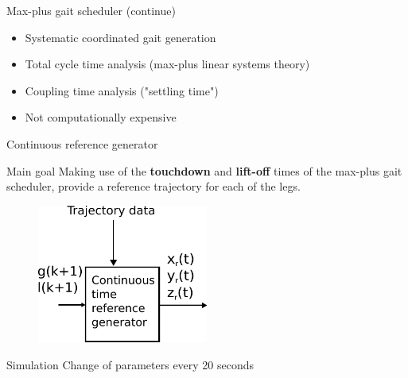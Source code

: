 \documentclass[10pt]{beamer}
\begin{document}
\begin{frame}{Max-plus gait scheduler (continue)}
\begin{itemize}
	\setlength\itemsep{2em}
	\item Systematic coordinated gait generation 
	\item Total cycle time analysis (max-plus linear systems theory)
	\item Coupling time analysis ("settling time")
	\item Not computationally expensive
\end{itemize}	
\end{frame}

\begin{frame}{Continuous reference generator}
	\begin{block}{Main goal}
		\Large Making use of the \textbf{touchdown} and \textbf{lift-off} times of the max-plus gait scheduler, provide a reference trajectory for each of the legs.
	\end{block}
	\begin{figure}[H]
		\includegraphics[width=0.5\textwidth]{AngularFrequency.pdf}
	\end{figure}
\end{frame}


\begin{frame}{Simulation}
Change of parameters every 20 seconds
\begin{center}
         \\
\end{center}

\end{frame}
\end{document}
